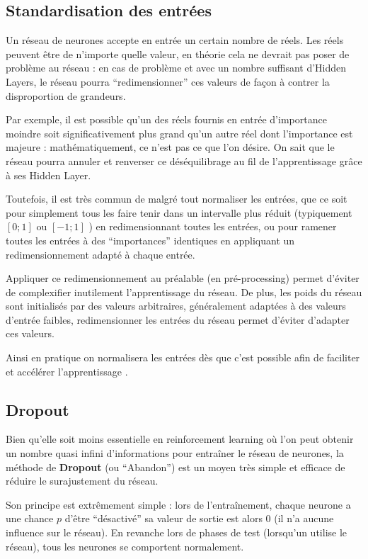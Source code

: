 \subsection{Standardisation des entrées}
Un réseau de neurones accepte en entrée un certain nombre de réels. Les réels peuvent être de n'importe quelle valeur, en théorie cela ne devrait pas poser de problème au réseau : en cas de problème et avec un nombre suffisant d'Hidden Layers, le réseau pourra ``redimensionner'' ces valeurs de façon à contrer la disproportion de grandeurs.
\par
Par exemple, il est possible qu'un des réels fournis en entrée d'importance moindre soit significativement plus grand qu'un autre réel dont l'importance est majeure : mathématiquement, ce n'est pas ce que l'on désire. On sait que le réseau pourra annuler et renverser ce déséquilibrage au fil de l'apprentissage grâce à ses Hidden Layer.
\par
Toutefois, il est très commun de malgré tout normaliser les entrées, que ce soit pour simplement tous les faire tenir dans un intervalle plus réduit (typiquement $[0;1]$ ou $[-1;1]$ ) en redimensionnant toutes les entrées, ou pour ramener toutes les entrées à des ``importances'' identiques en appliquant un redimensionnement adapté à chaque entrée.
\par
Appliquer ce redimensionnement au préalable (en pré-processing) permet d'éviter de complexifier inutilement l'apprentissage du réseau. De plus, les poids du réseau sont initialisés par des valeurs arbitraires, généralement adaptées à des valeurs d'entrée faibles, redimensionner les entrées du réseau permet d'éviter d'adapter ces valeurs.
\par
Ainsi en pratique on normalisera les entrées dès que c'est possible afin de faciliter et accélérer l'apprentissage \cite{ai_faq}.


\subsection{Dropout}
Bien qu'elle soit moins essentielle en reinforcement learning où l'on peut obtenir un nombre quasi infini d'informations pour entraîner le réseau de neurones, la méthode de \textbf{Dropout} (ou ``Abandon'') est un moyen très simple et efficace de réduire le surajustement du réseau.
\par
Son principe est extrêmement simple : lors de l'entraînement, chaque neurone a une chance $p$ d'être ``désactivé'' sa valeur de sortie est alors 0 (il n'a aucune influence sur le réseau). En revanche lors de phases de test (lorsqu'un utilise le réseau), tous les neurones se comportent normalement.

